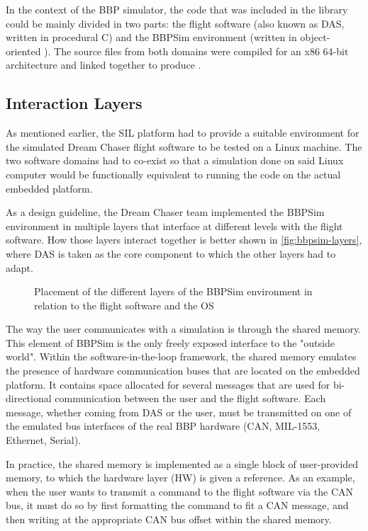 {In the context of the \gls{BBP} simulator, the code that was included in the library could be mainly divided in two parts: the flight software (also known as \gls{DAS}, written in procedural C) and the \gls{BBPSim} environment (written in object-oriented \Cpp). The source files from both domains were compiled for an x86 64-bit architecture and linked together to produce .

\subsection*{Interaction Layers}
As mentioned earlier, the \gls{SIL} platform had to provide a suitable environment for the simulated Dream Chaser flight software to be tested on a Linux machine. The two software domains had to co-exist so that a simulation done on said Linux computer would be functionally equivalent to running the code on the actual embedded platform. 

As a design guideline, the Dream Chaser team implemented the \gls{BBPSim} environment in multiple layers that interface at different levels with the flight software. How those layers interact together is better shown in \autoref{fig:bbpsim-layers}, where \gls{DAS} is taken as the core component to which the other layers had to adapt.

\begin{figure}[htbp]
	\vspace{12pt}
	\centering
	
	\caption{Placement of the different layers of the BBPSim environment in relation to the flight software and the OS}
	\label{fig:bbpsim-layers}
\end{figure}

The way the user communicates with a simulation is through the shared memory. This element of \gls{BBPSim} is the only freely exposed interface to the "outside world". Within the software-in-the-loop framework, the shared memory emulates the presence of hardware communication buses that are located on the embedded platform. It contains space allocated for several messages that are used for bi-directional communication between the user and the flight software. Each message, whether coming from DAS or the user, must be transmitted on one of the emulated bus interfaces of the real \gls{BBP} hardware (CAN, MIL-1553, Ethernet, Serial).

In practice, the shared memory is implemented as a single block of user-provided memory, to which the hardware layer (HW) is given a reference. As an example, when the user wants to transmit a command to the flight software via the CAN bus, it must do so by first formatting the command to fit a CAN message, and then writing at the appropriate CAN bus offset within the shared memory. 

}
